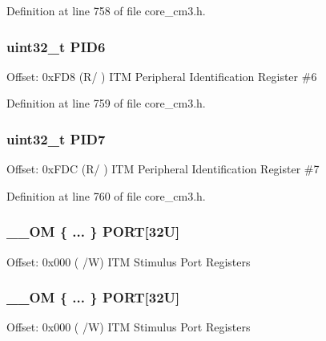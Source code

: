 Definition at line 758 of file core\+\_\+cm3.\+h.

\subsubsection[{\texorpdfstring{P\+I\+D6}{PID6}}]{ uint32\+\_\+t P\+I\+D6}\hypertarget{struct_i_t_m___type_a83ac5d00dee24cc7f805b5c147625593}{}\label{struct_i_t_m___type_a83ac5d00dee24cc7f805b5c147625593}
Offset\+: 0x\+F\+D8 (R/ ) I\+TM Peripheral Identification Register \#6 

Definition at line 759 of file core\+\_\+cm3.\+h.

\subsubsection[{\texorpdfstring{P\+I\+D7}{PID7}}]{ uint32\+\_\+t P\+I\+D7}\hypertarget{struct_i_t_m___type_af8aa73aeaf37bdf7dfd9f6c437ff2d2f}{}\label{struct_i_t_m___type_af8aa73aeaf37bdf7dfd9f6c437ff2d2f}
Offset\+: 0x\+F\+DC (R/ ) I\+TM Peripheral Identification Register \#7 

Definition at line 760 of file core\+\_\+cm3.\+h.

\subsubsection[{\texorpdfstring{P\+O\+RT}{PORT}}]{\setlength{\rightskip}{0pt plus 5cm}\+\_\+\+\_\+\+OM \{ ... \}    P\+O\+RT\mbox{[}32\+U\mbox{]}}\hypertarget{struct_i_t_m___type_a99bba7451f79c00e8684aa0986b74901}{}\label{struct_i_t_m___type_a99bba7451f79c00e8684aa0986b74901}
Offset\+: 0x000 ( /W) I\+TM Stimulus Port Registers 
\subsubsection[{\texorpdfstring{P\+O\+RT}{PORT}}]{\setlength{\rightskip}{0pt plus 5cm}\+\_\+\+\_\+\+OM \{ ... \}    P\+O\+RT\mbox{[}32\+U\mbox{]}}\hypertarget{struct_i_t_m___type_a5d8a5967362b507fd70e4c31ce7c5c3f}{}\label{struct_i_t_m___type_a5d8a5967362b507fd70e4c31ce7c5c3f}
Offset\+: 0x000 ( /W) I\+TM Stimulus Port Registers 
